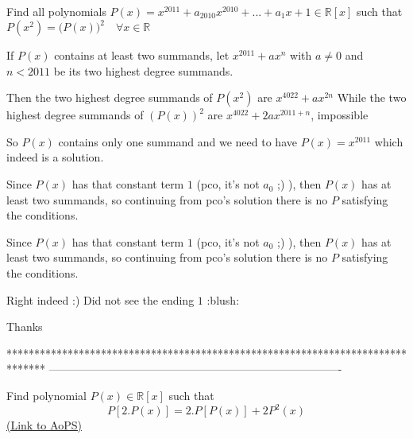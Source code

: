 \begin{solution}
	\begin{tcolorbox}Find all polynomials $P(x) = x^{2011}  + a_{2010} x^{2010}  + ... + a_1 x + 1 \in \mathbb{R}[x] $ such that $P(x^2 ) = ({P(x))^2\quad \forall x \in \mathbb{R}}$\end{tcolorbox}
If $P(x)$ contains at least two summands, let $x^{2011}+ax^n$ with $a\ne 0$ and $n<2011$ be its two highest degree summands.

Then the two highest degree summands of $P(x^2)$ are $x^{4022}+ax^{2n}$
While the two highest degree summands of $(P(x))^2$ are $x^{4022}+2ax^{2011+n}$, impossible

So $P(x)$ contains only one summand and we need to have $\boxed{P(x)=x^{2011}}$ which indeed is a solution.
\end{solution}



\begin{solution}
	Since $P(x)$ has that constant term $1$ (pco, it's not $a_0$ ;) ), then $P(x)$ has at least two summands, so continuing from pco's solution there is no $P$ satisfying the conditions.
\end{solution}



\begin{solution}
	\begin{tcolorbox}Since $P(x)$ has that constant term $1$ (pco, it's not $a_0$ ;) ), then $P(x)$ has at least two summands, so continuing from pco's solution there is no $P$ satisfying the conditions.\end{tcolorbox}
Right indeed :)
Did not see the ending $1$ :blush:

Thanks
\end{solution}
*******************************************************************************
-------------------------------------------------------------------------------

\begin{problem}
	Find polynomial $P(x)\in \mathbb{R}[x]$ such that \[P[2.P(x)]=2.P[P(x)]+2P^2(x)\]
	\flushright \href{https://artofproblemsolving.com/community/c6h568536}{(Link to AoPS)}
\end{problem}



